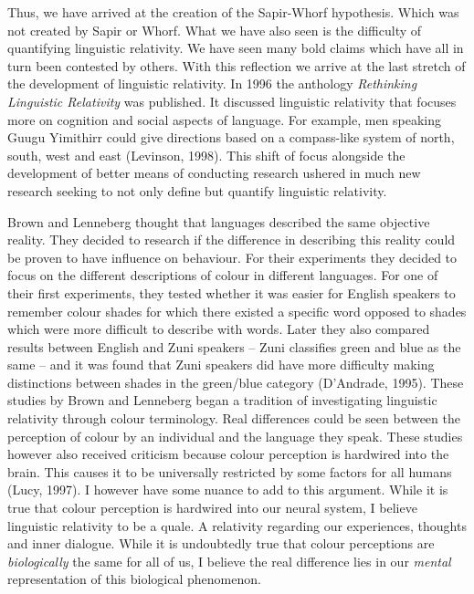 Thus, we have arrived at the creation of the Sapir-Whorf hypothesis. Which was not created by Sapir or Whorf. What we have also seen is the difficulty of quantifying linguistic relativity. We have seen many bold claims which have all in turn been contested by others. With this reflection we arrive at the last stretch of the development of linguistic relativity. In 1996 the anthology \textit{Rethinking Linguistic Relativity} was published. It discussed linguistic relativity that focuses more on cognition and social aspects of language. For example, men speaking Guugu Yimithirr could give directions based on a compass-like system of north, south, west and east (Levinson, 1998). This shift of focus alongside the development of better means of conducting research ushered in much new research seeking to not only define but quantify linguistic relativity.  

 
	Brown and Lenneberg thought that languages described the same objective reality. They decided to research if the difference in describing this reality could be proven to have influence on behaviour. For their experiments they decided to focus on the different descriptions of colour in different languages. For one of their first experiments, they tested whether it was easier for English speakers to remember colour shades for which there existed a specific word opposed to shades which were more difficult to describe with words. Later they also compared results between English and Zuni speakers – Zuni classifies green and blue as the same – and it was found that Zuni speakers did have more difficulty making distinctions between shades in the green/blue category (D’Andrade, 1995). These studies by Brown and Lenneberg began a tradition of investigating linguistic relativity through colour terminology. Real differences could be seen between the perception of colour by an individual and the language they speak. These studies however also received criticism because colour perception is hardwired into the brain. This causes it to be universally restricted by some factors for all humans (Lucy, 1997). I however have some nuance to add to this argument. While it is true that colour perception is hardwired into our neural system, I believe linguistic relativity to be a quale. A relativity regarding our experiences, thoughts and inner dialogue. While it is undoubtedly true that colour perceptions are \textit{biologically} the same for all of us, I believe the real difference lies in our \textit{mental} representation of this biological phenomenon.  

